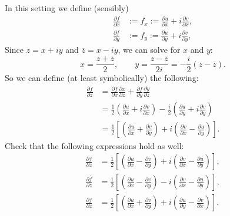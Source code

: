 \documentclass[12pt]{article}
\theoremstyle{definition}
\theoremstyle{remark}
\begin{document}
In this setting we define (sensibly)
\begin{equation}
    \begin{split}
        \frac{\partial f}{\partial x} & := f_x := \frac{\partial u}{\partial x} + i \frac{\partial v}{\partial x}, \\ 
        \frac{\partial f}{\partial y} & := f_y := \frac{\partial u}{\partial y} + i \frac{\partial v}{\partial y},
    \end{split}
\end{equation}
Since $z = x + i y$ and $\overline{z} = x - i y$, we can solve for $x$ and $y$:
\begin{equation}
    x = \frac{z + \overline{z}}{2} , \qquad y = \frac{z - \overline{z}}{2i} = -\frac{i}{2} \left( z - \overline{z} \right).
\end{equation}
So we can define (at least symbolically) the following:
\begin{equation}
    \begin{split}
        \frac{\partial f}{\partial z} & = \frac{\partial f}{\partial x} \frac{\partial x}{\partial z} + \frac{\partial f}{\partial y} \frac{\partial y}{\partial z} \\
        & = \frac{1}{2} \left( \frac{\partial u}{\partial x} + i\frac{\partial v}{\partial x} \right) - \frac{i}{2} \left( \frac{\partial u}{\partial y} + i\frac{\partial v}{\partial y} \right) \\
        & = \frac{1}{2} \left[ \left( \frac{\partial u}{\partial x} + \frac{\partial v}{\partial y} \right) + i\left( \frac{\partial v}{\partial x} - \frac{\partial u}{\partial y} \right) \right].
    \end{split}
\end{equation}
Check that the following expressions hold as well: 
\begin{equation}
    \begin{split}
        \frac{\partial f}{\partial \overline{z}} & = \frac{1}{2} \left[ \left( \frac{\partial u}{\partial x} - \frac{\partial v}{\partial y} \right) + i\left( \frac{\partial v}{\partial x} - \frac{\partial u}{\partial y} \right) \right], \\
        \frac{\partial \overline{f}}{\partial z} & = \frac{1}{2} \left[ \left( \frac{\partial u}{\partial x} - \frac{\partial v}{\partial y} \right) - i\left( \frac{\partial v}{\partial x} - \frac{\partial u}{\partial y} \right) \right], \\
        \frac{\partial f}{\partial z} & = \frac{1}{2} \left[ \left( \frac{\partial u}{\partial x} + \frac{\partial v}{\partial y} \right) + i\left( \frac{\partial u}{\partial y} - \frac{\partial v}{\partial x} \right) \right].
    \end{split}
\end{equation}
\end{document}
